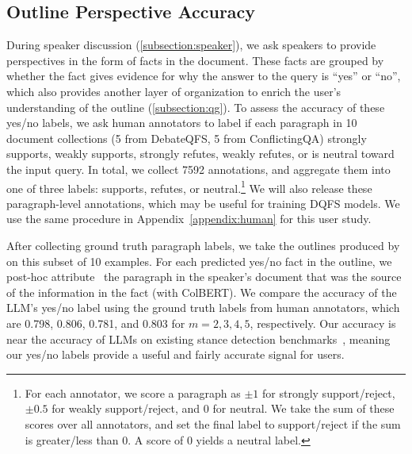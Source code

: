 
\subsection{Outline Perspective Accuracy} \label{appendix:outline}

During speaker discussion (\cref{subsection:speaker}), we ask speakers to provide perspectives in the form of facts in the document.
These facts are grouped by whether the fact gives evidence for why the answer to the query is ``yes'' or ``no'', which also provides another layer of organization to enrich the user's understanding of the outline (\cref{subsection:qg}).
To assess the accuracy of these yes/no labels, we ask human annotators to label if each paragraph in 10 document collections (5 from DebateQFS, 5 from ConflictingQA) strongly supports, weakly supports, strongly refutes, weakly refutes, or is neutral toward the input query.
In total, we collect 7592 annotations, and aggregate them into one of three labels: supports, refutes, or neutral.\footnote{For each annotator, we score a paragraph as $ \pm1$ for strongly support/reject, $\pm0.5$ for weakly support/reject, and 0 for neutral. We take the sum of these scores over all annotators, and set the final label to support/reject if the sum is greater/less than 0. A score of 0 yields a neutral label.}
We will also release these paragraph-level annotations, which may be useful for training DQFS models.
We use the same procedure in Appendix~\ref{appendix:human} for this user study.

After collecting ground truth paragraph labels, we take the outlines produced by \model on this subset of 10 examples. For each predicted yes/no fact in the outline, we post-hoc attribute~\cite{huang-chang-2024-citation} the paragraph in the speaker's document that was the source of the information in the fact (with ColBERT).
We compare the accuracy of the LLM's yes/no label using the ground truth labels from human annotators, which are 0.798, 0.806, 0.781, and 0.803 for $m = 2, 3, 4, 5$, respectively.
Our accuracy is near the accuracy of LLMs on existing stance detection benchmarks~\cite{lan2024stance}, meaning our yes/no labels provide a useful and fairly accurate signal for users.

